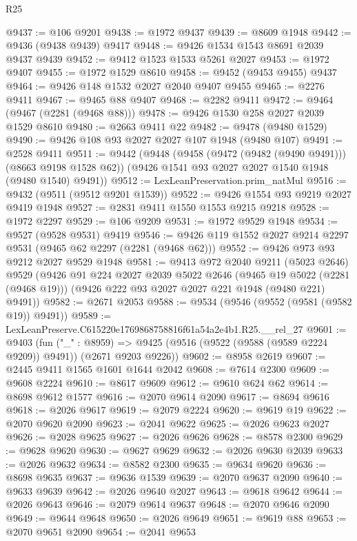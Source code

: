\begin{lexlean}{R25}
\begin{coremodule}
@9437 := @106 @9201
@9438 := @1972 @9437
@9439 := @8609 @1948
@9442 := @9436 (@9438 @9439) @9417
@9448 := @9426 @1534 @1543 @8691 @2039 @9437 @9439
@9452 := @9412 @1523 @1533 @5261 @2027
@9453 := @1972 @9407
@9455 := @1972 @1529 @8610
@9458 := @9452 (@9453 @9455) @9437
@9464 := @9426 @148 @1532 @2027 @2040 @9407 @9455
@9465 := @2276 @9411
@9467 := @9465 @88 @9407
@9468 := @2282 @9411
@9472 := @9464 (@9467 (@2281 (@9468 @88)))
@9478 := @9426 @1530 @258 @2027 @2039 @1529 @8610
@9480 := @2663 @9411 @22
@9482 := @9478 (@9480 @1529)
@9490 := @9426 @108 @93 @2027 @2027 @107 @1948 (@9480 @107)
@9491 := @2528 @9411
@9511 := @9442
    (@9448
      (@9458 (@9472 (@9482 (@9490 @9491))) (@8663 @9198 @1528 @62))
      (@9426 @1541 @93 @2027 @2027 @1540 @1948 (@9480 @1540) @9491))
@9512 := LexLeanPreservation.prim_natMul
@9516 := @9432 (@9511 (@9512 @9201 @1539))
@9522 := @9426 @1554 @93 @9219 @2027 @9419 @1948
@9527 := @2831 @9411 @1550 @1553 @9215 @9218
@9528 := @1972 @2297
@9529 := @106 @9209
@9531 := @1972 @9529 @1948
@9534 := @9527 (@9528 @9531) @9419
@9546 := @9426 @119 @1552 @2027 @9214 @2297 @9531 (@9465 @62 @2297 (@2281 (@9468 @62)))
@9552 := @9426 @973 @93 @9212 @2027 @9529 @1948
@9581 := @9413
    @972
    @2040
    @9211
    (@5023 @2646)
    @9529
    (@9426
      @91
      @224
      @2027
      @2039
      @5022
      @2646
      (@9465 @19 @5022 (@2281 (@9468 @19)))
      (@9426 @222 @93 @2027 @2027 @221 @1948 (@9480 @221) @9491))
@9582 := @2671 @2053
@9588 := @9534 (@9546 (@9552 (@9581 (@9582 @19)) @9491))
@9589 := LexLeanPreserve.C615220e1769868758816f61a54a2e4b1.R25.__rel_27
@9601 := @9403
    (fun ("_" : @8959) =>
    @9425 (@9516 (@9522 (@9588 (@9589 @2224 @9209)) @9491)) (@2671 @9203 @9226))
@9602 := @8958 @2619
@9607 := @2445 @9411 @1565 @1601 @1644 @2042
@9608 := @7614 @2300
@9609 := @9608 @2224
@9610 := @8617 @9609
@9612 := @9610 @624 @62
@9614 := @8698 @9612 @1577
@9616 := @2070 @9614 @2090
@9617 := @8694 @9616
@9618 := @2026 @9617
@9619 := @2079 @2224
@9620 := @9619 @19
@9622 := @2070 @9620 @2090
@9623 := @2041 @9622
@9625 := @2026 @9623 @2027
@9626 := @2028 @9625
@9627 := @2026 @9626
@9628 := @8578 @2300
@9629 := @9628 @9620
@9630 := @9627 @9629
@9632 := @2026 @9630 @2039
@9633 := @2026 @9632
@9634 := @8582 @2300
@9635 := @9634 @9620
@9636 := @8698 @9635
@9637 := @9636 @1539
@9639 := @2070 @9637 @2090
@9640 := @9633 @9639
@9642 := @2026 @9640 @2027
@9643 := @9618 @9642
@9644 := @2026 @9643
@9646 := @2079 @9614 @9637
@9648 := @2070 @9646 @2090
@9649 := @9644 @9648
@9650 := @2026 @9649
@9651 := @9619 @88
@9653 := @2070 @9651 @2090
@9654 := @2041 @9653

\end{coremodule}
\end{lexlean}
